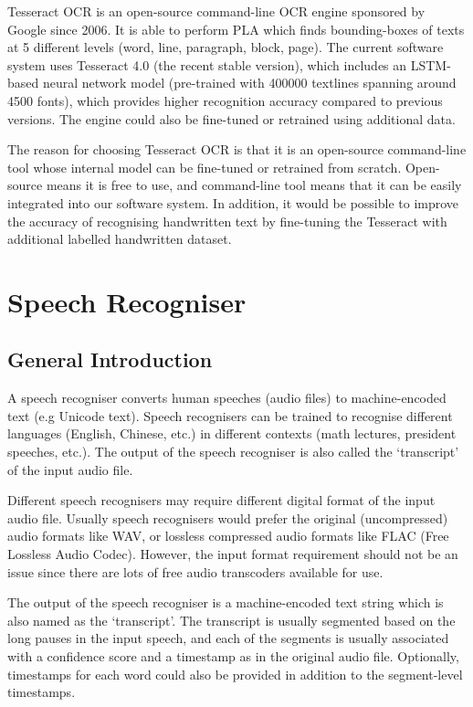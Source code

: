 Tesseract OCR is an open-source command-line OCR engine sponsored by Google since 2006. It is able to perform PLA which finds bounding-boxes of texts at 5 different levels (word, line, paragraph, block, page). The current software system uses Tesseract 4.0 (the recent stable version), which includes an LSTM-based neural network model (pre-trained with 400000 textlines spanning around 4500 fonts), which provides higher recognition accuracy compared to previous versions. The engine could also be fine-tuned or retrained using additional data.

The reason for choosing Tesseract OCR is that it is an open-source command-line tool whose internal model can be fine-tuned or retrained from scratch. Open-source means it is free to use, and command-line tool means that it can be easily integrated into our software system. In addition, it would be possible to improve the accuracy of recognising handwritten text by fine-tuning the Tesseract with additional labelled handwritten dataset.


\section{Speech Recogniser}

\subsection{General Introduction}

A speech recogniser converts human speeches (audio files) to machine-encoded text (e.g Unicode text). Speech recognisers can be trained to recognise different languages (English, Chinese, etc.) in different contexts (math lectures, president speeches, etc.). The output of the speech recogniser is also called the `transcript' of the input audio file.

Different speech recognisers may require different digital format of the input audio file. Usually speech recognisers would prefer the original (uncompressed) audio formats like WAV, or lossless compressed audio formats like FLAC (Free Lossless Audio Codec). However, the input format requirement should not be an issue since there are lots of free audio transcoders available for use.

The output of the speech recogniser is a machine-encoded text string which is also named as the `transcript'. The transcript is usually segmented based on the long pauses in the input speech, and each of the segments is usually associated with a confidence score and a timestamp as in the original audio file. Optionally, timestamps for each word could also be provided in addition to the segment-level timestamps.


